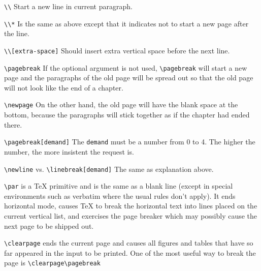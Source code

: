 \documentclass[12pt, a4paper]{article}
\begin{document}
\verb|\\| Start a new line in current paragraph.

\verb|\\*| Is the same as above except that it indicates not to start a new page after the line.

\verb|\\[extra-space]| Should insert extra vertical space before the next line.


\verb|\pagebreak| If the optional argument is not used, \verb|\pagebreak| will start a new page and the paragraphs of the old page will be spread out so that the old page will not look like the end of a chapter.

\verb|\newpage| On the other hand, the old page will have the blank space at the bottom, because the paragraphs will stick together as if the chapter had ended there.

\verb|\pagebreak[demand]| The \verb|demand| must be a number from 0 to 4. The higher the number, the more insistent the request is.

\verb|\newline| vs. \verb|\linebreak[demand]| The same as explanation above.


\verb|\par| is a TeX primitive and is the same as a blank line (except in special environments such as verbatim where the usual rules don't apply). It ends horizontal mode, causes TeX to break the horizontal text into lines placed on the current vertical list, and exercises the page breaker which may possibly cause the next page to be shipped out.


\verb|\clearpage| ends the current page and causes all figures and tables that have so far appeared in the input to be printed. One of the most useful way to break the page is \verb|\clearpage\pagebreak|
\end{document}
